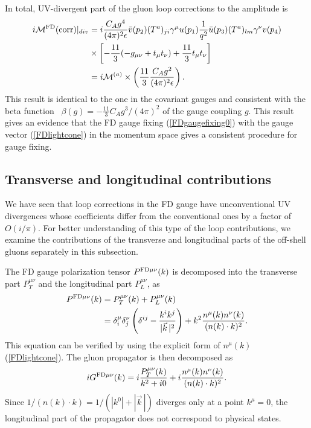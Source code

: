 \documentclass[preprint,amsmath,amssymb,superscriptaddress, floatfix,nofootinbib]{revtex4}
\begin{document}
In total, UV-divergent part of the gluon loop corrections to the amplitude is 
\begin{align} 
i{\cal M}^{\rm FD}({\rm corr})|_{div} & =
i\frac{C_A g^4}{(4\pi)^2\epsilon} 
\bar{v}(p_2)(T^a)_{ji} \gamma^{\mu}u(p_1) \frac{1}{q^2}
\bar{u}(p_3)(T^a)_{lm} \gamma^{\nu} v(p_4)
\nonumber \\
& \times 
\left[  -\frac{11}{3}  
(-g_{\mu\nu}+t_{\mu}t_{\nu})  +\frac{11}{3} t_{\mu} t_{\nu} \right] 
\nonumber \\
& = i{\cal M}^{(a)} \times \left( 
\frac{11}{3}\frac{C_A g^2}{(4\pi)^2\epsilon} \right) .
\end{align}
This result is identical to the one in the covariant gauges 
and consistent with the beta function~\cite{Gross:1973id,Politzer:1973fx}
$\beta(g)=-\frac{11}{3}C_A g^3/(4\pi)^2$ of the gauge coupling $g$. 
This result gives an evidence that the FD gauge fixing (\ref{FDgaugefixing0}) 
with the gauge vector (\ref{FDlightcone}) in the momentum space 
gives
a consistent procedure for gauge fixing. 


\subsection{Transverse and longitudinal contributions}

We have seen that loop corrections in the FD gauge have unconventional 
UV divergences whose coefficients differ from the conventional 
ones by a factor of $O(i/\pi)$. 
For better understanding of this type 
of the loop contributions, 
we examine the contributions of 
the transverse and longitudinal parts of the off-shell gluons 
separately in this subsection. 

The FD gauge polarization tensor $P^{{\rm FD}\mu\nu}(k)$ 
is decomposed into the transverse part 
$P_T^{\mu\nu}$ and the longitudinal part $P_L^{\mu\nu}$, 
as \cite{Hagiwara:2020tbx} 
\begin{align}
P^{{\rm FD}\mu\nu}(k) %
& = P_T^{\mu\nu}(k) + P_L^{\mu\nu}(k) 
\nonumber \\
&= \delta^{\mu}_i\delta^{\nu}_j \left( 
\delta^{ij} -\frac{{k}^{i}{k}^{j}}{|\vec{k}\,|^2} 
\right) +  k^2 \frac{n^{\mu}(k) n^{\nu}(k)} {(n(k)\cdot k)^2}  . \label{eq9}
\end{align}
This equation can be verified by using the explicit form of 
$n^{\mu}(k)$ (\ref{FDlightcone}). 
The gluon propagator is then decomposed as 
\begin{equation}
iG^{{\rm FD}\mu\nu}(k) = i\frac{P_T^{\mu\nu}(k)}{k^2+i0} + 
i\frac{n^{\mu}(k) n^{\nu}(k)} {(n(k)\cdot k)^2} .  \label{eq10}
\end{equation}
Since $1/(n(k)\cdot k)=1/(|k^0|+|\vec{k}\,|)$ diverges 
only at a point $k^{\mu}=0$, the longitudinal part 
of the propagator does not correspond to physical states. 
\end{document}
